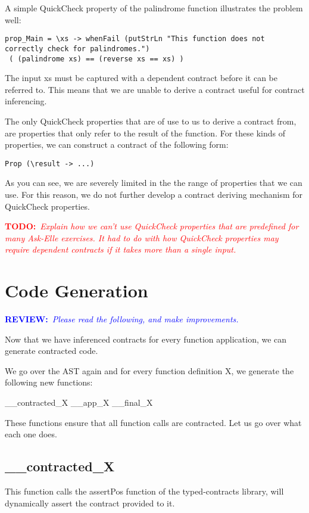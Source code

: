 \documentclass[10pt]{report}
\newcommand{\annotate}[3]{
	\begin{scriptsize}
	\textcolor{#1}{\textbf{#2}~\textit{#3}}
	\end{scriptsize}\newline}
\newcommand{\todo}[1]{\annotate{red} {TODO:} {#1}}
\newcommand{\review}{\annotate{blue} {REVIEW:} {Please read the following, and make improvements. \newline}}
\begin{document}
A simple QuickCheck property of the palindrome function illustrates the problem well:

\begin{lstlisting}
prop_Main = \xs -> whenFail (putStrLn "This function does not correctly check for palindromes.") 
 ( (palindrome xs) == (reverse xs == xs) )  
\end{lstlisting}

The input xs must be captured with a dependent contract before it can be referred to.
This means that we are unable to derive a contract useful for contract inferencing.

The only QuickCheck properties that are of use to us to derive a contract from, are properties that only refer to the result of the function.
For these kinds of properties, we can construct a contract of the following form:

\begin{lstlisting}
Prop (\result -> ...)
\end{lstlisting}

As you can see, we are severely limited in the the range of properties that we can use.
For this reason, we do not further develop a contract deriving mechanism for QuickCheck properties.
 
\todo {Explain how we can't use QuickCheck properties that are predefined for many Ask-Elle exercises. It had to do with how QuickCheck properties may require dependent contracts if it takes more than a single input.}

\section{Code Generation}
\label{codegeneration}

\review

Now that we have inferenced contracts for every function application, we can generate contracted code.

We go over the AST again and for every function definition X, we generate the following new functions:

\_\_contracted\_X
\_\_app\_X
\_\_final\_X

These functions ensure that all function calls are contracted. Let us go over what each one does.

\subsection{\_\_contracted\_X}
This function calls the assertPos function of the typed-contracts library, will dynamically assert the contract provided to it.
\end{document}

